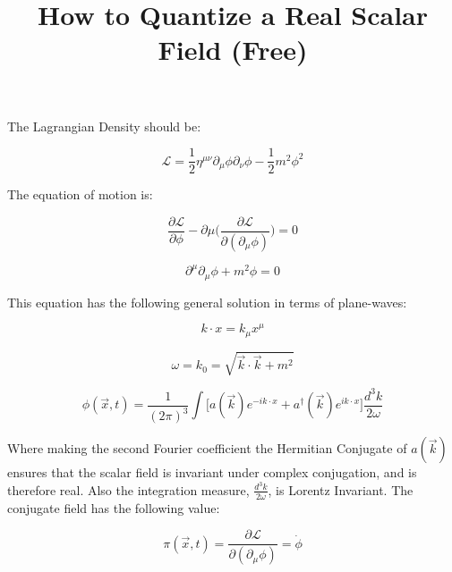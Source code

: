 \documentclass{article}
\begin{document}
    \title{How to Quantize a Real Scalar Field (Free)}
    \maketitle

    The Lagrangian Density should be:

    \begin{equation}
        \mathcal{L} = \frac{1}{2} \eta^{\mu \nu} \partial_{\mu} \phi \partial_{\nu} \phi - \frac{1}{2} m^{2} \phi^{2}
    \end{equation}

    The equation of motion is:

    \begin{equation}
        \frac{\partial \mathcal{L}}{\partial \phi} - \partial{\mu} \Big( \frac{\partial \mathcal{L}}{\partial (\partial_{\mu} \phi)} \Big) = 0
    \end{equation}

    \begin{equation}
        \partial^{\mu} \partial_{\mu} \phi + m^{2} \phi = 0
    \end{equation}

    This equation has the following general solution in terms of plane-waves:

    \begin{equation}
        k \cdot x = k_{\mu} x^{\mu}
    \end{equation}

    \begin{equation}
        \omega = k_{0} = \sqrt{\vec{k} \cdot \vec{k} + m^{2}}
    \end{equation}

    \begin{equation}
        \phi (\vec{x}, t) = \frac{1}{(2 \pi)^3} \int \Big[ a(\vec{k}) e^{-i k \cdot x} + a^{\dag}(\vec{k}) e^{i k \cdot x} \Big] \frac{d^3k}{2 \omega}
    \end{equation}

    Where making the second Fourier coefficient the Hermitian Conjugate of $a(\vec{k})$ ensures that the scalar field is invariant under
    complex conjugation, and is therefore real. Also the integration measure, $\frac{d^3 k}{2 \omega}$, is Lorentz Invariant. The 
    conjugate field has the following value:

    \begin{equation}
        \pi (\vec{x}, t) = \frac{\partial \mathcal{L}}{\partial (\partial_{\mu} \phi)} = \dot{\phi}
    \end{equation}
\end{document}
